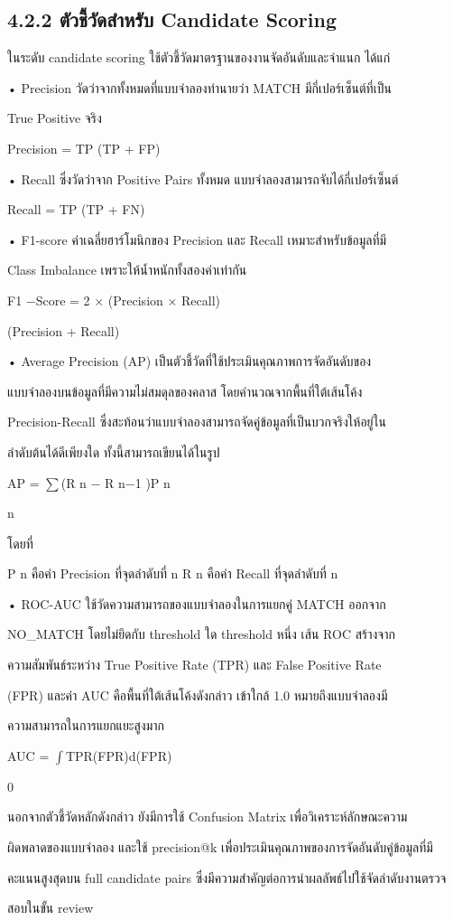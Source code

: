 \documentclass[12pt,a4paper]{report}
\begin{document}
\subsection*{4.2.2 ตัวชี้วัดสำหรับ Candidate Scoring}
ในระดับ candidate scoring ใช้ตัวชี้วัดมาตรฐานของงานจัดอันดับและจำแนก ได้แก่\par
\noindent • Precision วัดว่าจากทั้งหมดที่แบบจำลองทำนายว่า MATCH มีกี่เปอร์เซ็นต์ที่เป็น\par
True Positive จริง\par
Precision = TP (TP + FP)\par
\noindent • Recall ซึ่งวัดว่าจาก Positive Pairs ทั้งหมด แบบจำลองสามารถจับได้กี่เปอร์เซ็นต์\par
Recall = TP (TP + FN)\par
\noindent • F1-score ค่าเฉลี่ยฮาร์โมนิกของ Precision และ Recall เหมาะสำหรับข้อมูลที่มี\par
Class Imbalance เพราะให้น้ำหนักทั้งสองค่าเท่ากัน\par
F1 −Score = 2 × (Precision × Recall)\par
(Precision + Recall)\par
\noindent • Average Precision (AP) เป็นตัวชี้วัดที่ใช้ประเมินคุณภาพการจัดอันดับของ\par
แบบจำลองบนข้อมูลที่มีความไม่สมดุลของคลาส โดยคำนวณจากพื้นที่ใต้เส้นโค้ง\par
Precision-Recall ซึ่งสะท้อนว่าแบบจำลองสามารถจัดคู่ข้อมูลที่เป็นบวกจริงให้อยู่ใน\par
ลำดับต้นได้ดีเพียงใด ทั้งนี้สามารถเขียนได้ในรูป\par
AP = \ensuremath{\sum}(R n − R n−1 )P n\par
n\par
โดยที่\par
P n คือค่า Precision ที่จุดลำดับที่ n R n คือค่า Recall ที่จุดลำดับที่ n\par
\noindent • ROC-AUC ใช้วัดความสามารถของแบบจำลองในการแยกคู่ MATCH ออกจาก\par
NO\_MATCH โดยไม่ยึดกับ threshold ใด threshold หนึ่ง เส้น ROC สร้างจาก\par
ความสัมพันธ์ระหว่าง True Positive Rate (TPR) และ False Positive Rate\par
(FPR) และค่า AUC คือพื้นที่ใต้เส้นโค้งดังกล่าว เข้าใกล้ 1.0 หมายถึงแบบจำลองมี\par
ความสามารถในการแยกแยะสูงมาก\par
\par
AUC = \ensuremath{\int}TPR(FPR)d(FPR)\par
0\par
นอกจากตัวชี้วัดหลักดังกล่าว ยังมีการใช้ Confusion Matrix เพื่อวิเคราะห์ลักษณะความ\par
ผิดพลาดของแบบจำลอง และใช้ precision@k เพื่อประเมินคุณภาพของการจัดอันดับคู่ข้อมูลที่มี\par
คะแนนสูงสุดบน full candidate pairs ซึ่งมีความสำคัญต่อการนำผลลัพธ์ไปใช้จัดลำดับงานตรวจ\par
สอบในขั้น review\par
\end{document}
